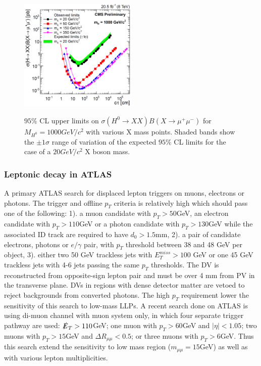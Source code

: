 \begin{figure}
    \centering
    \caption{$95\%$ CL upper limits on $\sigma(H^0\rightarrow XX)B(X \rightarrow \mu^{+} \mu^{−} )$ for $M_{H^0} = 1000 GeV/c^2$ with various X mass points. Shaded bands show the $\pm 1\sigma$ range of variation of the expected $95\%$ CL limits for the case of a $20 GeV/c^2$ X boson mass. \cite{CMSDiMuon2015}}
    \includegraphics[width=0.5\textwidth]{fig/LpetonicCMSMSMuMu.png}
    \label{fig:LpetonicCMSMSMuMu}
\end{figure}


\subsubsection{Leptonic decay in ATLAS}
 A primary ATLAS search for displaced lepton triggers on muons, electrons or photons. The trigger and offline $p_T$ criteria is relatively high which should pass one of the following: 1). a muon candidate with $p_T > 50$GeV, an electron candidate with $p_T >110$GeV or a photon candidate with $p_T > 130$GeV while the associated ID track are required to have $d_0 > 1.5$mm, 2). a pair of candidate electrons, photons or $e/\gamma$ pair, with $p_T$ threshold between 38 and 48 GeV per object, 3). either two 50 GeV trackless jets with $E_T^{miss} > 100$ GeV or one 45 GeV trackless jets with 4-6 jets passing the same $p_T$ thresholds.  The DV is reconstructed from opposite-sign lepton pair and must be over 4 mm from PV in the transverse plane. DVs in regions with dense detector matter are vetoed to reject backgrounds from converted photons. The high $p_T$ requirement lower the sensitivity of this search to low-mass LLPs.
  A recent search done on ATLAS is using di-muon channel with muon system only, in which four separate trigger pathway are used: $\slashed{E}_T > 110 $GeV; one muon with $p_T > 60$GeV and $|\eta|<1.05$; two muons with $p_T > 15$GeV and $\Delta R_{\mu\mu}<0.5$; or three muons with $p_T > 6$GeV. Thus this search extend the sensitivity to low mass region ($m_{\mu\mu}=15$GeV) as well as with various lepton multiplicities.

